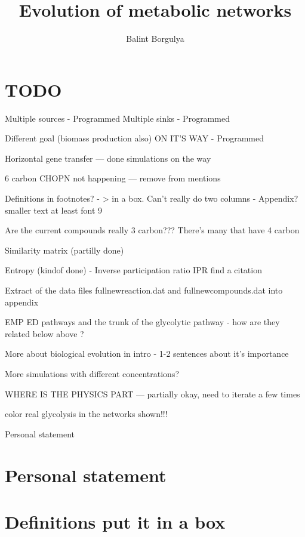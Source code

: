 \documentclass[10pt,a4paper]{article}
\title{Evolution of metabolic networks}
\author{Balint Borgulya}
\begin{document}
	
	
	
	\maketitle
	
	\begin{abstract}
		
	\end{abstract}
	
	\section*{TODO}
	\label{sec:todo}
	
	Multiple sources - Programmed
	Multiple sinks - Programmed

	Different goal (biomass production also) ON IT'S WAY - Programmed

	Horizontal gene transfer --- done simulations on the way

	6 carbon CHOPN not happening --- remove from mentions

	Definitions in footnotes? - > in a box. Can't really do two columns - Appendix? smaller text at least font 9

	Are the current compounds really 3 carbon??? There's many that have 4 carbon

	Similarity matrix (partilly done)

	Entropy (kindof done) - Inverse participation ratio  IPR find a citation

	Extract of the data files fullnewreaction.dat and fullnewcompounds.dat into appendix

	EMP ED pathways and the trunk of the glycolytic pathway - how are they related below above ?

	More about biological evolution in intro - 1-2 sentences about it's importance

	More simulations with different concentrations?

	WHERE IS THE PHYSICS PART --- partially okay, need to iterate a few times

	color real glycolysis in the networks shown!!!

	Personal statement

	\section{Personal statement}

	\section*{Definitions put it in a box}
	
\end{document}
